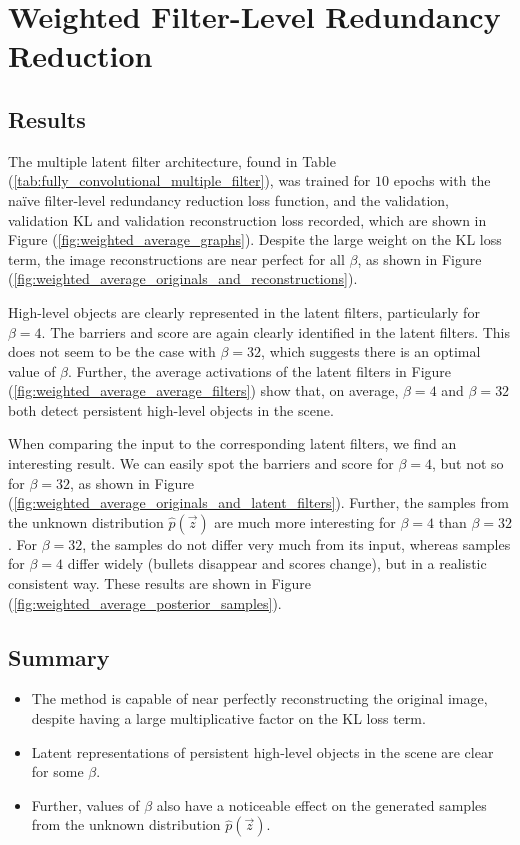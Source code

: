 \clearpage
%
%
%
%
%
\section{Weighted Filter-Level Redundancy Reduction}

\subsection{Results}
The multiple latent filter architecture, found in Table (\ref{tab:fully_convolutional_multiple_filter}), was trained for $10$ epochs with the na{\"i}ve filter-level redundancy reduction loss function, and the validation, validation KL and validation reconstruction loss recorded, which are shown in Figure (\ref{fig:weighted_average_graphs}). Despite the large weight on the KL loss term, the image reconstructions are near perfect for all $\beta$, as shown in Figure (\ref{fig:weighted_average_originals_and_reconstructions}). 

High-level objects are clearly represented in the latent filters, particularly for $\beta = 4$. The barriers and score are again clearly identified in the latent filters. This does not seem to be the case with $\beta = 32$, which suggests there is an optimal value of $\beta$. Further, the average activations of the latent filters in Figure (\ref{fig:weighted_average_average_filters}) show that, on average, $\beta = 4$ and $\beta = 32$ both detect persistent high-level objects in the scene.

When comparing the input to the corresponding latent filters, we find an interesting result. We can easily spot the barriers and score for $\beta=4$, but not so for $\beta = 32$, as shown in Figure (\ref{fig:weighted_average_originals_and_latent_filters}). Further, the samples from the unknown distribution $\hat{p}(\vec{z})$ are much more interesting for $\beta = 4$ than $\beta = 32$. For $\beta = 32$, the samples do not differ very much from its input, whereas samples for $\beta = 4$ differ widely (bullets disappear and scores change), but in a realistic consistent way. These results are shown in Figure (\ref{fig:weighted_average_posterior_samples}).

\subsection{Summary}

\begin{itemize}
\item The method is capable of near perfectly reconstructing the original image, despite having a large multiplicative factor on the KL loss term.
\item Latent representations of persistent high-level objects in the scene are clear for some $\beta$.
\item Further, values of $\beta$ also have a noticeable effect on the generated samples from the unknown distribution $\hat{p}(\vec{z})$.
\end{itemize}



